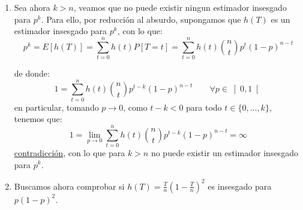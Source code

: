 \begin{ejercicio}
\begin{enumerate}[label=\alph*)]
            Finalmente, como:
            \begin{equation*}
                E\left[{(h(T))}^{2}\right] = \sum_{t=0}^{n}{(h(t))}^{2}P[T=t] < \infty
            \end{equation*}
            y teníamos que $T$ era un estimador suficiente y completo (cuando vimos que $\{B(1,p) : p\in \left]0,1\right[\}$ era una familia exponencial), tenemos entonces que $E[h(T)/T] = h(T)$ es el UMVUE de $p^k$.
        \item Sea ahora $k>n$, veamos que no puede existir ningun estimador insesgado para $p^k$. Para ello, por reducción al absurdo, supongamos que $h(T)$ es un estimador insesgado para $p^k$, con lo que:
            \begin{equation*}
                p^k = E[h(T)] = \sum_{t=0}^{n}h(t)P[T=t] = \sum_{t=0}^{n}h(t)\binom{n}{t}p^t {(1-p)}^{n-t}
            \end{equation*}

            de donde:
            \begin{equation*}
                1 = \sum_{t=0}^{n}h(t)\binom{n}{t}p^{t-k} {(1-p)}^{n-t} \qquad \forall p \in \left]0,1\right[
            \end{equation*}
            en particular, tomando $p\to 0$, como $t-k < 0$ para todo $t \in \{0,\ldots,k\}$, tenemos que:
            \begin{equation*}
                1 = \lim_{p\to0} \sum_{t=0}^{n}h(t)\binom{n}{t}p^{t-k} {(1-p)}^{n-t} = \infty
            \end{equation*}
            \underline{contradicción}, con lo que para $k>n$ no puede existir un estimador insesgado para $p^k$.
        \item Buscamos ahora comprobar si $h(T) = \frac{T}{n}{\left(1-\frac{T}{n}\right)}^{2}$ es insesgado para $p{(1-p)}^{2}$.  %
    \end{enumerate}
\end{ejercicio}

